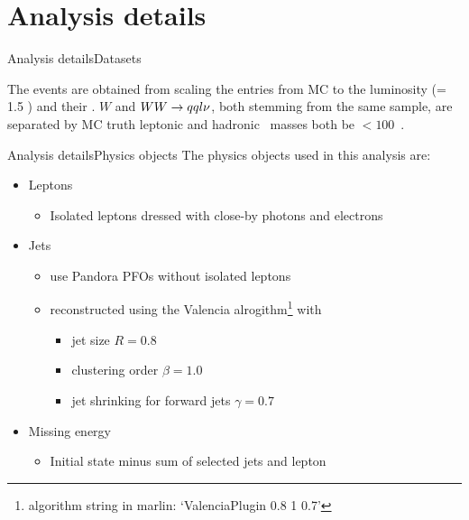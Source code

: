 
\section{Analysis details}

\begin{frame}{Analysis details}{Datasets}

\vspace{-0.5cm}
The events are obtained from scaling the entries from MC to the luminosity (\lumi = 1.5 \invab) and their \xsec.
%
$W$ and $WW\rightarrow qql\nu$, both stemming from the same sample, are separated by MC truth leptonic and hadronic \Wboson\ masses both be $< 100$~\GeV.
\end{frame}


\begin{frame}{Analysis details}{Physics objects}
The physics objects used in this analysis are:
\begin{itemize}
  \item Leptons
  \begin{itemize}
    \item Isolated leptons dressed with close-by photons and electrons
  \end{itemize}
  \item Jets
  \begin{itemize}
    \item use Pandora PFOs without isolated leptons
    \item reconstructed using the Valencia alrogithm\footnote{algorithm string in marlin: `ValenciaPlugin 0.8 1 0.7'} with
    \begin{itemize}
      \item jet size $R=0.8$
      \item clustering order $\beta=1.0$
      \item jet shrinking for forward jets $\gamma=0.7$
    \end{itemize}
  \end{itemize}
  \item Missing energy
  \begin{itemize}
    \item Initial state minus sum of selected jets and lepton
  \end{itemize}
\end{itemize}
\end{frame}



